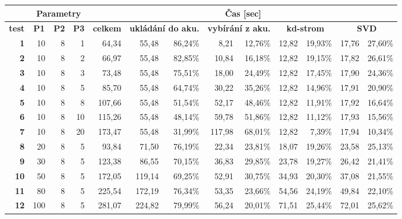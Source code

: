 \documentclass[11pt,twoside,a4paper]{book}
\begin{document}
\begin{table}[ht]
\resizebox{\textwidth}{!} {
\begin{tabular}{|r|r|r|r|r|r|r|r|r|r|r|r|r|}
\hline
\multicolumn{1}{|l|}{} & \multicolumn{ 3}{c|}{\textbf{Parametry}} & \multicolumn{ 9}{c|}{\textbf{Čas [sec]}} \\ \hline
\multicolumn{1}{|c|}{\textbf{test}} & \multicolumn{1}{c|}{\textbf{P1}} & \multicolumn{1}{c|}{\textbf{P2}} & \multicolumn{1}{c|}{\textbf{P3}} & \multicolumn{1}{c|}{\textbf{celkem}} & \multicolumn{ 2}{c|}{\textbf{ukládání do aku.}} & \multicolumn{ 2}{c|}{\textbf{vybírání z aku.}} & \multicolumn{ 2}{c|}{\textbf{kd-strom}} & \multicolumn{ 2}{c|}{\textbf{SVD}} \\ \hline
\textbf{1} & 10 & 8 & 1 & 64,34 & 55,48 & 86,24\% & 8,21 & 12,76\% & 12,82 & 19,93\% & 17,76 & 27,60\% \\ \hline
\textbf{2} & 10 & 8 & 2 & 66,97 & 55,48 & 82,85\% & 10,84 & 16,18\% & 12,82 & 19,15\% & 17,82 & 26,61\% \\ \hline
\textbf{3} & 10 & 8 & 3 & 73,48 & 55,48 & 75,51\% & 18,00 & 24,49\% & 12,82 & 17,45\% & 17,90 & 24,36\% \\ \hline
\textbf{4} & 10 & 8 & 5 & 85,70 & 55,48 & 64,74\% & 30,22 & 35,26\% & 12,82 & 14,96\% & 17,91 & 20,90\% \\ \hline
\textbf{5} & 10 & 8 & 8 & 107,66 & 55,48 & 51,54\% & 52,17 & 48,46\% & 12,82 & 11,91\% & 17,92 & 16,64\% \\ \hline
\textbf{6} & 10 & 8 & 10 & 115,26 & 55,48 & 48,14\% & 59,78 & 51,86\% & 12,82 & 11,12\% & 17,93 & 15,56\% \\ \hline
\textbf{7} & 10 & 8 & 20 & 173,47 & 55,48 & 31,99\% & 117,98 & 68,01\% & 12,82 & 7,39\% & 17,94 & 10,34\% \\ \hline
\textbf{8} & 20 & 8 & 5 & 93,84 & 71,50 & 76,19\% & 22,34 & 23,81\% & 18,07 & 19,26\% & 23,58 & 25,13\% \\ \hline
\textbf{9} & 30 & 8 & 5 & 123,38 & 86,55 & 70,15\% & 36,83 & 29,85\% & 23,78 & 19,27\% & 26,42 & 21,41\% \\ \hline
\textbf{10} & 50 & 8 & 5 & 172,05 & 119,14 & 69,25\% & 52,91 & 30,75\% & 34,93 & 20,30\% & 37,08 & 21,55\% \\ \hline
\textbf{11} & 80 & 8 & 5 & 225,54 & 172,19 & 76,34\% & 53,35 & 23,66\% & 54,56 & 24,19\% & 49,84 & 22,10\% \\ \hline
\textbf{12} & 100 & 8 & 5 & 281,07 & 224,82 & 79,99\% & 56,24 & 20,01\% & 71,51 & 25,44\% & 72,01 & 25,62\% \\ \hline

\end{tabular}}
\end{table}
\end{document}
